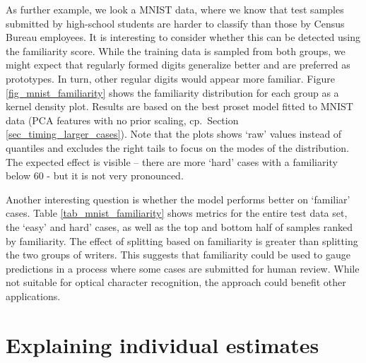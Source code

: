 %
As further example, we look a MNIST data, where we know that test samples submitted by high-school students are harder to classify than those by Census Bureau employees.
It is interesting to consider whether this can be detected using the familiarity score.
While the training data is sampled from both groups, we might expect that regularly formed digits generalize better and are preferred as prototypes.
In turn, other regular digits would appear more familiar.
Figure \ref{fig_mnist_familiarity} shows the familiarity distribution for each group as a kernel density plot.
Results are based on the best proset model fitted to MNIST data (PCA features with no prior scaling, cp.\ Section \ref{sec_timing_larger_cases}).
Note that the plots shows `raw' values instead of quantiles and excludes the right tails to focus on the modes of the distribution.
The expected effect is visible -- there are more `hard' cases with a familiarity below 60 - but it is not very pronounced.\par
%
Another interesting question is whether the model performs better on `familiar' cases.
Table \ref{tab_mnist_familiarity} shows metrics for the entire test data set, the `easy' and hard' cases, as well as the top and bottom half of samples ranked by familiarity.
The effect of splitting based on familiarity is greater than splitting the two groups of writers.
This suggests that familiarity could be used to gauge predictions in a process where some cases are submitted for human review.
While not suitable for optical character recognition, the approach could benefit other applications.
%
\section{Explaining individual estimates}
\label{sec_individual_explanations}
%
